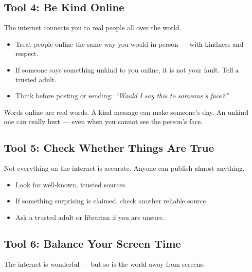 \vspace{6pt}

\subsection*{Tool 4: Be Kind Online}

The internet connects you to real people all over the world.

\begin{itemize}
  \item Treat people online the same way you would in person — with kindness and respect.
  \item If someone says something unkind to you online, it is not your fault.
        Tell a trusted adult.
  \item Think before posting or sending: \emph{``Would I say this to someone's face?''}
\end{itemize}

\begin{picturethis}
  Words online are real words.
  A kind message can make someone's day.
  An unkind one can really hurt — even when you cannot see the person's face.
\end{picturethis}

\vspace{6pt}

\subsection*{Tool 5: Check Whether Things Are True}

Not everything on the internet is accurate.
Anyone can publish almost anything.

\begin{itemize}
  \item Look for well-known, trusted sources.
  \item If something surprising is claimed, check another reliable source.
  \item Ask a trusted adult or librarian if you are unsure.
\end{itemize}

\vspace{6pt}

\subsection*{Tool 6: Balance Your Screen Time}

The internet is wonderful — but so is the world away from screens.

